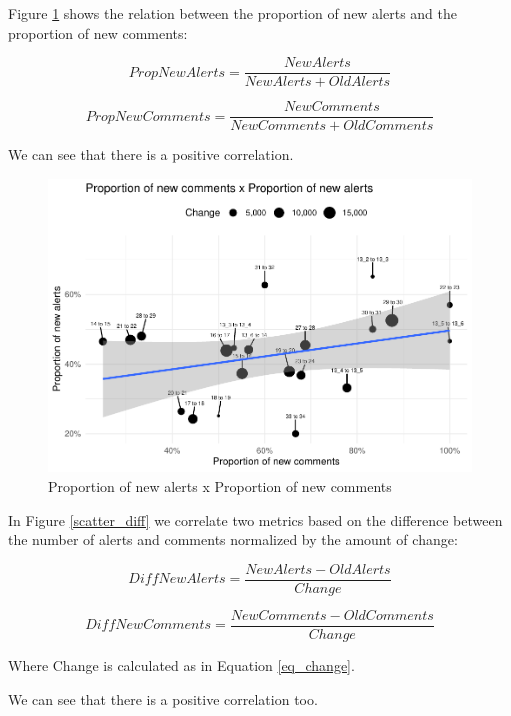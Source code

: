 \documentclass[
]{article}
\begin{document}
Figure \ref{scatter_prop} shows the relation between the proportion of
new alerts and the proportion of new comments:

\[PropNewAlerts = \frac{NewAlerts}{NewAlerts + OldAlerts}\]

\[PropNewComments = \frac{NewComments}{NewComments + OldComments}\]

We can see that there is a positive correlation.

\small

\begin{figure}
\centering
\includegraphics{report_files/figure-latex/unnamed-chunk-22-1.pdf}
\caption{\label{scatter_prop}Proportion of new alerts x Proportion of
new comments}
\end{figure}

\normalsize

In Figure \ref{scatter_diff} we correlate two metrics based on the
difference between the number of alerts and comments normalized by the
amount of change:

\[DiffNewAlerts = \frac{NewAlerts - OldAlerts}{Change}\]

\[DiffNewComments = \frac{NewComments - OldComments}{Change}\]

Where Change is calculated as in Equation \ref{eq_change}.

We can see that there is a positive correlation too.

\small
\end{document}
